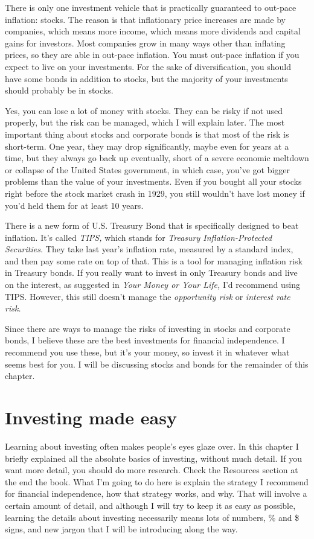 There is only one investment vehicle that is practically guaranteed to out-pace inflation: stocks. The reason is that inflationary price increases are made by companies, which means more income, which means more dividends and capital gains for investors. Most companies grow in many ways other than inflating prices, so they are able in out-pace inflation. You must out-pace inflation if you expect to live on your investments. For the sake of diversification, you should have some bonds in addition to stocks, but the majority of your investments should probably be in stocks.

Yes, you can lose a lot of money with stocks. They can be risky if not used properly, but the risk can be managed, which I will explain later. The most important thing about stocks and corporate bonds is that most of the risk is short-term. One year, they may drop significantly, maybe even for years at a time, but they always go back up eventually, short of a severe economic meltdown or collapse of the United States government, in which case, you've got bigger problems than the value of your investments. Even if you bought all your stocks right before the stock market crash in 1929, you still wouldn't have lost money if you'd held them for at least 10 years.

There is a new form of U.S. Treasury Bond that is specifically designed to beat inflation. It's called \emph{TIPS,} which stands for \emph{Treasury Inflation-Protected Securities.} They take last year's inflation rate, measured by a standard index, and then pay some rate on top of that. This is a tool for managing inflation risk in Treasury bonds. If you really want to invest in only Treasury bonds and live on the interest, as suggested in \emph{Your Money or Your Life,} I'd recommend using TIPS. However, this still doesn't manage the \emph{opportunity risk} or \emph{interest rate risk.}

Since there are ways to manage the risks of investing in stocks and corporate bonds, I believe these are the best investments for financial independence. I recommend you use these, but it's your money, so invest it in whatever what seems best for you. I will be discussing stocks and bonds for the remainder of this chapter.

\section{Investing made easy}
Learning about investing often makes people's eyes glaze over. In this chapter I briefly explained all the absolute basics of investing, without much detail. If you want more detail, you should do more research. Check the Resources section at the end the book. What I'm going to do here is explain the strategy I recommend for financial independence, how that strategy works, and why. That will involve a certain amount of detail, and although I will try to keep it as easy as possible, learning the details about investing necessarily means lots of numbers, \% and \$ signs, and new jargon that I will be introducing along the way.

